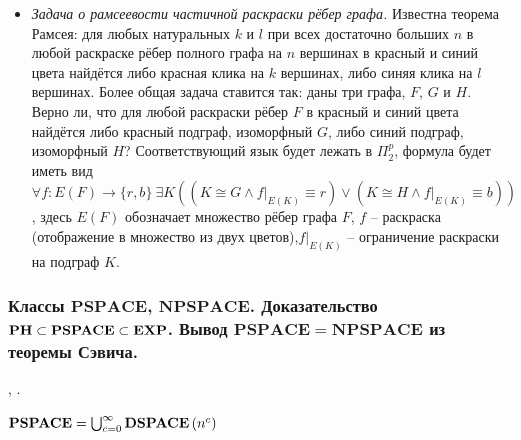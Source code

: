 \begin{itemize}
    \item \textit{Задача о рамсеевости частичной раскраски рёбер графа.} Известна теорема Рамсея: для любых натуральных $k$ и $l$ при всех достаточно больших $n$ в любой раскраске рёбер полного графа на $n$ вершинах в красный и синий цвета найдётся либо красная клика на $k$ вершинах, либо синяя клика на $l$ вершинах. Более общая задача ставится так: даны три графа, $F$, $G$ и $H$. Верно ли, что для любой раскраски рёбер $F$ в красный и синий цвета найдётся либо красный подграф, изоморфный $G$, либо синий подграф, изоморфный $H$? Соответствующий язык будет лежать в $\Pi_2^p$, формула будет иметь вид $\forall f : E(F) \to \{r, b\} \ \exists K ((K \cong G \wedge f |_{E(K)} \equiv r) \vee (K \cong H \wedge f |_{E(K)} \equiv b))$, здесь $E(F)$ обозначает множество рёбер графа $F$, $f$ -- раскраска (отображение в множество из двух цветов),$f |_{E(K)}$ -- ограничение раскраски на подграф $K$.
    
\end{itemize}


\subsubsection{Классы $\mathbf{PSPACE}$, $\mathbf{NPSPACE}$. Доказательство $\mathbf{PH} \subset \textbf{PSPACE} \subset \textbf{EXP}$. Вывод $\mathbf{PSPACE} = \mathbf{NPSPACE}$ из теоремы Сэвича.}

\lsp, \nlsp.
\begin{definition} 
$\mathbf{PSPACE}=\bigcup_{c=0}^{\infty}\textbf{DSPACE}\left({n^c}\right)$
\end{definition}

